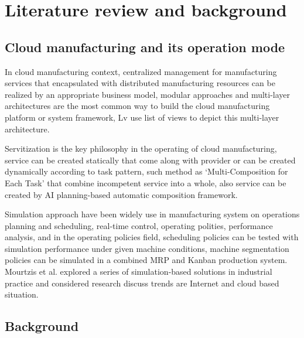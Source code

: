 \section{Literature review and background} %
\label{sec:literature_review}
\subsection{Cloud manufacturing and its operation mode} %
\label{sub:cloud_manufacturing review}

In cloud manufacturing context, centralized management for manufacturing services that encapsulated with distributed manufacturing resources can be realized by an appropriate business model\cite{Xu2012}, modular approaches and multi-layer architectures are the most common way to build the cloud manufacturing platform or system framework\cite{Tao2012,Valilai2013}, Lv use list of views to depict this multi-layer architecture\cite{LvJuly312012-Aug.22012}. 

Servitization is the key philosophy in the operating of cloud manufacturing\cite{li2010cloud}, service can be created statically that come along with provider\cite{Tao2012} or can be created dynamically according to task pattern, such method as `Multi-Composition for Each Task'\cite{Liu2013} that combine incompetent service into a whole, also service can be created by AI planning-based automatic composition framework\cite{OhJan.-March2008}. 

Simulation approach have been widely use in manufacturing system on operations planning and scheduling, real-time control, operating polities, performance analysis\cite{Smith2003}, and in the operating policies field, scheduling policies can be tested with simulation performance under given machine conditions\cite{Sabuncuoglu2003}, machine
segmentation policies can be simulated in a combined MRP and Kanban production system\cite{Felberbauer9-12Dec.2012}. Mourtzis et al.\cite{Mourtzis2015} explored a series of simulation-based solutions in industrial practice and considered research discuss trends are Internet and cloud based situation.

\subsection{Background} %
\label{sub:background}

